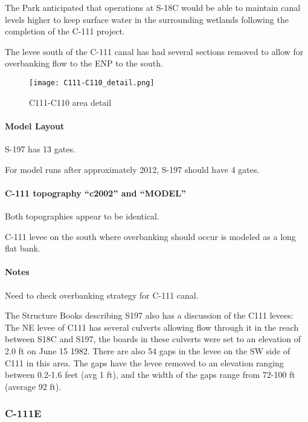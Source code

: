 The Park anticipated that operations at S-18C would be able to maintain canal levels higher to keep surface water in the surrounding wetlands following the completion of the C-111 project.

The levee south of the C-111 canal has had several sections removed to allow for overbanking flow to the ENP to the south.

\begin{figure}[!h]
  \begin{center}
  \texttt{[image: C111-C110\_detail.png]}
  \caption{C111-C110 area detail}
  \end{center}
\end{figure}

\paragraph{Model Layout}

S-197 has 13 gates.

For model runs after approximately 2012, S-197 should have 4 gates.

\paragraph{C-111 topography ``c2002'' and ``MODEL''}
Both topographies appear to be identical.

C-111 levee on the south where overbanking should occur is modeled as a long flat bank.

\begin{notes}
\paragraph{Notes}
Need to check overbanking strategy for C-111 canal.


The Structure Books describing S197 also has a discussion of the C111 levees: The NE levee of C111 has several culverts allowing flow through it in the reach between S18C and S197, the boards in these culverts were set to an elevation of 2.0 ft on June 15 1982. There are also 54 gaps in the levee on the SW side of C111 in this area. The gaps have the levee removed to an elevation ranging between 0.2-1.6 feet (avg 1 ft), and the width of the gaps range from 72-100 ft (average  92 ft).
\end{notes}

\clearpage
\subsubsection{C-111E}
